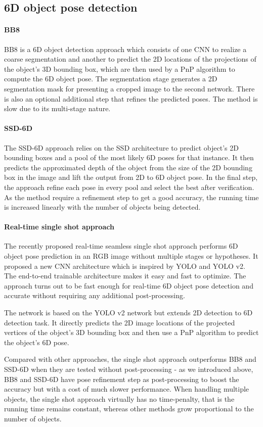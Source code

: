 \subsection{6D object pose detection}

\paragraph{BB8}
BB8 \cite{rad2017bb8} is a 6D object detection approach which consists of one CNN to realize a coarse segmentation and another to predict the 2D locations of the projections of the object’s 3D bounding box, which are then used by a PnP algorithm to compute the 6D object pose. The segmentation stage generates a 2D segmentation mask for presenting a cropped image to the second network. There is also an optional additional step that refines the predicted poses. The method is slow due to its multi-stage nature.

\paragraph{SSD-6D}
The SSD-6D \cite{kehl2017ssd} approach relies on the SSD architecture to predict object's 2D bounding boxes and a pool of the most likely 6D poses for that instance. It then predicts the approximated depth of the object from the size of the 2D bounding box in the image and lift the output from 2D to 6D object pose. In the final step, the approach refine each pose in every pool and select the best after verification. As the method require a refinement step to get a good accuracy, the running time is increased linearly with the number of objects being detected.

\paragraph{Real-time single shot approach}

The recently proposed real-time seamless single shot approach \cite{tekin2018real} performs 6D object pose prediction in an RGB image without multiple stages or hypotheses. It proposed a new CNN architecture which is inspired by YOLO and YOLO v2. The end-to-end trainable architecture makes it easy and fast to optimize. The approach turns out to be fast enough for real-time 6D object pose detection and accurate without requiring any additional post-processing.

The network is based on the YOLO v2 network but extends 2D detection to 6D detection task. It directly predicts the 2D image locations of the projected vertices of the object’s 3D bounding box and then use a PnP algorithm to predict the object’s 6D pose.

Compared with other approaches, the single shot approach outperforms BB8 \cite{rad2017bb8} and SSD-6D \cite{kehl2017ssd} when they are tested without post-processing - as we introduced above, BB8 and SSD-6D have pose refinement step as post-processing to boost the accuracy but with a cost of much slower performance. When handling multiple objects, the single shot approach virtually has no time-penalty, that is the running time remains constant, whereas other methods grow proportional to the number of objects.